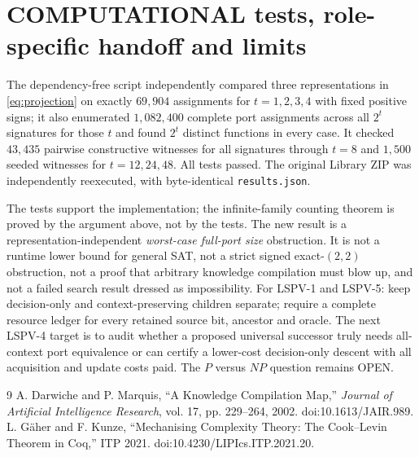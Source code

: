 \documentclass[11pt]{article}
\begin{document}
\section{COMPUTATIONAL tests, role-specific handoff and limits}
The dependency-free script independently compared three representations in \eqref{eq:projection} on exactly $69{,}904$ assignments for $t=1,2,3,4$ with fixed positive signs; it also enumerated $1{,}082{,}400$ complete port assignments across all $2^t$ signatures for those $t$ and found $2^t$ distinct functions in every case. It checked $43{,}435$ pairwise constructive witnesses for all signatures through $t=8$ and $1{,}500$ seeded witnesses for $t=12,24,48$. All tests passed. The original Library ZIP was independently reexecuted, with byte-identical \texttt{results.json}.

The tests support the implementation; the infinite-family counting theorem is proved by the argument above, not by the tests. The new result is a representation-independent \emph{worst-case full-port size} obstruction. It is not a runtime lower bound for general SAT, not a strict signed exact-$(2,2)$ obstruction, not a proof that arbitrary knowledge compilation must blow up, and not a failed search result dressed as impossibility. For LSPV-1 and LSPV-5: keep decision-only and context-preserving children separate; require a complete resource ledger for every retained source bit, ancestor and oracle. The next LSPV-4 target is to audit whether a proposed universal successor truly needs all-context port equivalence or can certify a lower-cost decision-only descent with all acquisition and update costs paid. The $P$ versus $NP$ question remains OPEN.

\begin{thebibliography}{9}
 A. Darwiche and P. Marquis, ``A Knowledge Compilation Map,'' \emph{Journal of Artificial Intelligence Research}, vol. 17, pp. 229--264, 2002. doi:10.1613/JAIR.989.
 L. G\"aher and F. Kunze, ``Mechanising Complexity Theory: The Cook--Levin Theorem in Coq,'' ITP 2021. doi:10.4230/LIPIcs.ITP.2021.20.
\end{thebibliography}
\end{document}
